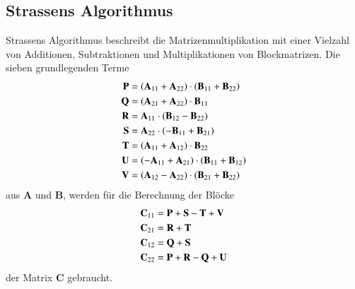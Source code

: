 \subsection{Strassens Algorithmus}

Strassens Algorithmus \cite{multiplikation:strassen_1969} beschreibt die Matrizenmultiplikation mit einer Vielzahl von Additionen, Subtraktionen und Multiplikationen von Blockmatrizen.
Die sieben grundlegenden Terme
\begin{equation} \label{multiplikation:eq:strassen}
\begin{split}
\text{\textbf{P}}   &= \left(\mathbf{A}_{11} + \mathbf{A}_{22}\right ) \cdot \left(\mathbf{B}_{11} + \mathbf{B}_{22}\right ) \\
\text{\textbf{Q}}  &= \left(\mathbf{A}_{21} + \mathbf{A}_{22}\right ) \cdot \mathbf{B}_{11} \\
\text{\textbf{R}} &= \mathbf{A}_{11} \cdot \left(\mathbf{B}_{12}-\mathbf{B}_{22}\right ) \\
\text{\textbf{S}}  &= \mathbf{A}_{22} \cdot \left(-\mathbf{B}_{11}+\mathbf{B}_{21}\right ) \\
\text{\textbf{T}}   &= \left(\mathbf{A}_{11} + \mathbf{A}_{12}\right ) \cdot \mathbf{B}_{22} \\
\text{\textbf{U}}  &= \left(-\mathbf{A}_{11} + \mathbf{A}_{21}\right ) \cdot \left(\mathbf{B}_{11} + \mathbf{B}_{12}\right ) \\
\text{\textbf{V}} &= \left(\mathbf{A}_{12} - \mathbf{A}_{22}\right ) \cdot \left(\mathbf{B}_{21} + \mathbf{B}_{22}\right )
\end{split}
\end{equation}
aus $\mathbf{A}$ und $\mathbf{B}$, werden f\"ur die Berechnung der Bl\"ocke
\begin{equation} \label{multiplikation:eq:strassen2}
\begin{split}
\mathbf{C}_{11} &= \text{\textbf{P}} + \text{\textbf{S}} - \text{\textbf{T}} + \text{\textbf{V}} \\
\mathbf{C}_{21} &= \text{\textbf{R}} + \text{\textbf{T}} \\
\mathbf{C}_{12} &= \text{\textbf{Q}} + \text{\textbf{S}}\\
\mathbf{C}_{22} &= \text{\textbf{P}} + \text{\textbf{R}} - \text{\textbf{Q}} + \text{\textbf{U}}
\end{split}
\end{equation}
der Matrix $\mathbf{C}$ gebraucht.
